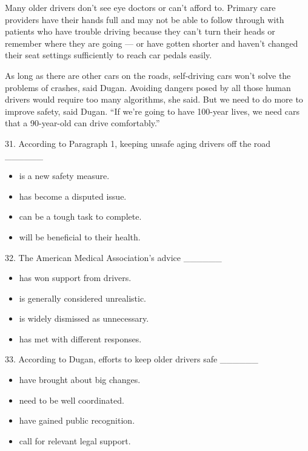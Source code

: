 \documentclass[UTF8,11pt]{ctexart}
\begin{document}
Many older drivers don’t see eye doctors or can’t afford to. Primary care providers have their hands full and may not be able to follow through with patients who have trouble driving because they can’t turn their heads or remember where they are going — or have gotten shorter and haven’t changed their seat settings sufficiently to reach car pedals easily.


As long as there are other cars on the roads, self-driving cars won’t solve the problems of crashes, said Dugan. Avoiding dangers posed by all those human drivers would require too many algorithms, she said. But we need to do more to improve safety, said Dugan. “If we’re going to have 100-year lives, we need cars that a 90-year-old can drive comfortably.”


31. According to Paragraph 1, keeping unsafe aging drivers off the road \_\_\_\_\_\_


\begin{itemize}[leftmargin=2em,itemsep=.2em,topsep=.4em]\item[A.] is a new safety measure.
\item[B.] has become a disputed issue.
\item[C.] can be a tough task to complete.
\item[D.] will be beneficial to their health.
\end{itemize}

32. The American Medical Association’s advice \_\_\_\_\_\_


\begin{itemize}[leftmargin=2em,itemsep=.2em,topsep=.4em]\item[A.] has won support from drivers.
\item[B.] is generally considered unrealistic.
\item[C.] is widely dismissed as unnecessary.
\item[D.] has met with different responses.
\end{itemize}

33. According to Dugan, efforts to keep older drivers safe \_\_\_\_\_\_


\begin{itemize}[leftmargin=2em,itemsep=.2em,topsep=.4em]\item[A.] have brought about big changes.
\item[B.] need to be well coordinated.
\item[C.] have gained public recognition.
\item[D.] call for relevant legal support.
\end{itemize}
\end{document}
